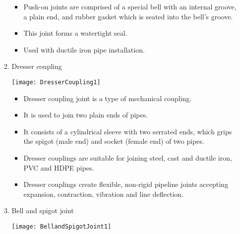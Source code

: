 \begin{itemize}
\begin{enumerate}
\begin{minipage}{0.55\textwidth}
\begin{itemize}
\item Push-on joints are comprised of a special bell with an internal groove, a plain end, and rubber gasket which is seated into the bell's groove.
\item This joint forms a watertight seal.
\item Used with ductile iron pipe installation.
\end{itemize}
\end{minipage}
\vspace{0.3cm}
\item Dresser coupling \\
\begin{minipage}{0.3\textwidth}
\texttt{[image: DresserCoupling1]}
\end{minipage}
\begin{minipage}{0.1\textwidth}
\end{minipage}
\begin{minipage}{0.55\textwidth}
\begin{itemize}
\item Dresser coupling joint is a type of mechanical coupling.
\item It is used to join two plain ends of pipes.
\item It consists of a cylindrical sleeve with two serrated ends, which grips the spigot (male end) and socket (female end) of two pipes.
\item Dresser couplings are suitable for joining steel, cast and ductile iron, PVC and HDPE pipes.
\item Dresser couplings create flexible, non-rigid pipeline joints accepting
expansion, contraction, vibration and line deflection.
\end{itemize}
\end{minipage}
\vspace{0.3cm}
\item Bell and spigot joint \\
\begin{minipage}{0.3\textwidth}
\texttt{[image: BellandSpigotJoint1]}
\end{minipage}
\begin{minipage}{0.1\textwidth}
\end{minipage}
\begin{minipage}{0.55\textwidth}
\begin{itemize}

\end{itemize}
\end{minipage}
\end{enumerate}
\end{itemize}
